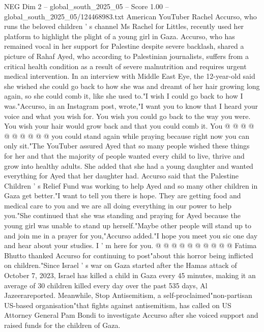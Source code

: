 \begin{textsample}{NEG Dim 2 – global\_south\_2025\_05 – Score 1.00 – global\_south\_2025\_05/124468983.txt}  \label{ex:f2_neg_151}
American YouTuber Rachel Accurso, who runs the beloved children ' s channel Ms Rachel for Littles, recently used her platform to highlight the plight of a young girl in Gaza.
Accurso, who has remained vocal in her support for Palestine despite severe backlash, shared a picture of Rahaf Ayed, who according to Palestinian journalists, suffers from a critical health condition as a result of severe malnutrition and requires urgent medical intervention.
In an interview with Middle East Eye, the 12-year-old said she wished she could go back to how she was and dreamt of her hair growing long again, so she could comb it, like she used to."I wish I could go back to how I was."Accurso, in an Instagram post, wrote,"I want you to know that I heard your voice and what you wish for.
You wish you could go back to the way you were.
You wish your hair would grow back and that you could comb it.
You @ @ @ @ @ @ @ @ @ @ you could stand again while praying because right now you can only sit."The YouTuber assured Ayed that so many people wished these things for her and that the majority of people wanted every child to live, thrive and grow into healthy adults.
She added that she had a young daughter and wanted everything for Ayed that her daughter had.
Accurso said that the Palestine Children ' s Relief Fund was working to help Ayed and so many other children in Gaza get better."I want to tell you there is hope.
They are getting food and medical care to you and we are all doing everything in our power to help you."She continued that she was standing and praying for Ayed because the young girl was unable to stand up herself."Maybe other people will stand up to and join me in a prayer for you,"Accurso added."I hope you meet you sic one day and hear about your studies.
I ' m here for you. @ @ @ @ @ @ @ @ @ @ Fatima Bhutto thanked Accurso for continuing to post"about this horror being inflicted on children."Since Israel ' s war on Gaza started after the Hamas attack of October 7, 2023, Israel has killed a child in Gaza every 45 minutes, making it an average of 30 children killed every day over the past 535 days, Al Jazeerareported.
Meanwhile, Stop Antisemitism, a self-proclaimed"non-partisan US-based organisation"that fights against antisemitism, has called on US Attorney General Pam Bondi to investigate Accurso after she voiced support and raised funds for the children of Gaza.

\end{textsample}
